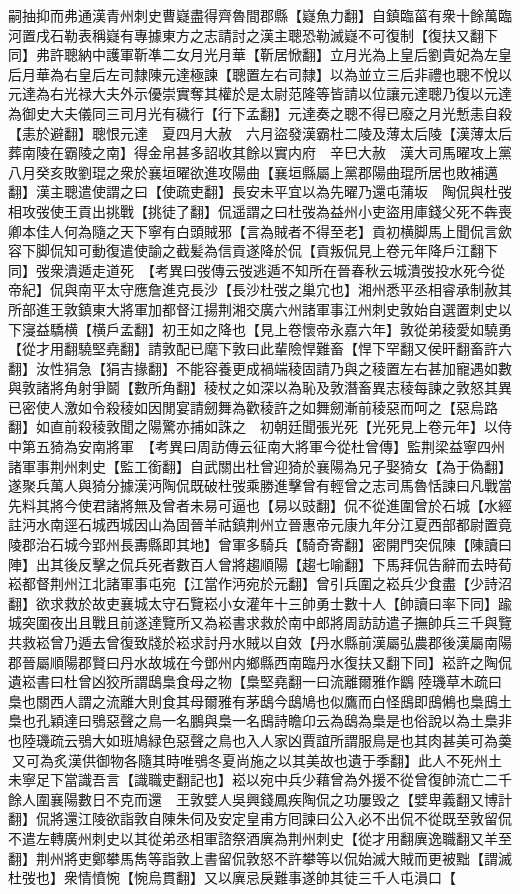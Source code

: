 嗣抽抑而弗通漢青州刺史曹嶷盡得齊魯間郡縣【嶷魚力翻】自鎮臨菑有衆十餘萬臨河置戌石勒表稱嶷有專據東方之志請討之漢主聰恐勒滅嶷不可復制【復扶又翻下同】弗許聰納中護軍靳凖二女月光月華【靳居惞翻】立月光為上皇后劉貴妃為左皇后月華為右皇后左司隸陳元達極諫【聰置左右司隸】以為並立三后非禮也聰不悅以元達為右光禄大夫外示優崇實奪其權於是太尉范隆等皆請以位讓元達聰乃復以元達為御史大夫儀同三司月光有穢行【行下孟翻】元達奏之聰不得已廢之月光慙恚自殺【恚於避翻】聰恨元達　夏四月大赦　六月盜發漢霸杜二陵及薄太后陵【漢薄太后葬南陵在霸陵之南】得金帛甚多詔收其餘以實内府　辛巳大赦　漢大司馬曜攻上黨八月癸亥敗劉琨之衆於襄垣曜欲進攻陽曲【襄垣縣屬上黨郡陽曲琨所居也敗補邁翻】漢主聰遣使謂之曰【使疏吏翻】長安未平宜以為先曜乃還屯蒲坂　陶侃與杜弢相攻弢使王貢出挑戰【挑徒了翻】侃遥謂之曰杜弢為益州小吏盜用庫錢父死不犇喪卿本佳人何為隨之天下寧有白頭賊邪【言為賊者不得至老】貢初横脚馬上聞侃言歛容下脚侃知可動復遣使諭之截髪為信貢遂降於侃【貢叛侃見上卷元年降戶江翻下同】弢衆潰遁走道死　【考異曰弢傳云弢逃遁不知所在晉春秋云城潰弢投水死今從帝紀】侃與南平太守應詹進克長沙【長沙杜弢之巢宂也】湘州悉平丞相睿承制赦其所部進王敦鎮東大將軍加都督江揚荆湘交廣六州諸軍事江州刺史敦始自選置刺史以下寖益驕横【横戶孟翻】初王如之降也【見上卷懷帝永嘉六年】敦從弟稜愛如驍勇【從才用翻驍堅堯翻】請敦配已麾下敦曰此輩險悍難畜【悍下罕翻又侯旰翻畜許六翻】汝性狷急【狷吉掾翻】不能容養更成禍端稜固請乃與之稜置左右甚加寵遇如數與敦諸將角射爭鬬【數所角翻】稜杖之如深以為恥及敦潛畜異志稜每諫之敦怒其異已密使人激如令殺稜如因閒宴請劒舞為歡稜許之如舞劒漸前稜惡而呵之【惡烏路翻】如直前殺稜敦聞之陽驚亦捕如誅之　初朝廷聞張光死【光死見上卷元年】以侍中第五猗為安南將軍　【考異曰周訪傳云征南大將軍今從杜曾傳】監荆梁益寧四州諸軍事荆州刺史【監工銜翻】自武關出杜曾迎猗於襄陽為兄子娶猗女【為于偽翻】遂聚兵萬人與猗分據漢沔陶侃既破杜弢乘勝進擊曾有輕曾之志司馬魯恬諫曰凡戰當先料其將今使君諸將無及曾者未易可逼也【易以豉翻】侃不從進圍曾於石城【水經註沔水南逕石城西城因山為固晉羊祜鎮荆州立晉惠帝元康九年分江夏西部都尉置竟陵郡治石城今郢州長夀縣即其地】曾軍多騎兵【騎奇寄翻】密開門突侃陳【陳讀曰陣】出其後反擊之侃兵死者數百人曾將趨順陽【趨七喻翻】下馬拜侃告辭而去時荀崧都督荆州江北諸軍事屯宛【江當作沔宛於元翻】曾引兵圍之崧兵少食盡【少詩沼翻】欲求救於故吏襄城太守石覽崧小女灌年十三帥勇士數十人【帥讀曰率下同】踰城突圍夜出且戰且前遂達覽所又為崧書求救於南中郎將周訪訪遣子撫帥兵三千與覽共救崧曾乃遁去曾復致牋於崧求討丹水賊以自效【丹水縣前漢屬弘農郡後漢屬南陽郡晉屬順陽郡賢曰丹水故城在今鄧州内鄉縣西南臨丹水復扶又翻下同】崧許之陶侃遺崧書曰杜曾凶狡所謂鴟梟食母之物【梟堅堯翻一曰流離爾雅作鶹陸璣草木疏曰梟也關西人謂之流離大則食其母爾雅有茅鴟今鴟鳩也似鷹而白怪䲭即䲭鵂也梟䲭土梟也孔穎達曰鴞惡聲之鳥一名鵬與梟一名䲭詩瞻卬云為鴟為梟是也俗說以為土梟非也陸璣疏云鴞大如班鳩緑色惡聲之鳥也入人家凶賈誼所謂服鳥是也其肉甚美可為羮又可為炙漢供御物各隨其時唯鴞冬夏尚施之以其美故也遺于季翻】此人不死州土未寧足下當識吾言【識職吏翻記也】崧以宛中兵少藉曾為外援不從曾復帥流亡二千餘人圍襄陽數日不克而還　王敦嬖人吳興錢鳳疾陶侃之功屢毁之【嬖卑義翻又博計翻】侃將還江陵欲詣敦自陳朱伺及安定皇甫方囘諫曰公入必不出侃不從既至敦留侃不遣左轉廣州刺史以其從弟丞相軍諮祭酒廙為荆州刺史【從才用翻廙逸職翻又羊至翻】荆州將吏鄭攀馬雋等詣敦上書留侃敦怒不許攀等以侃始滅大賊而更被黜【謂滅杜弢也】衆情憤惋【惋烏貫翻】又以廙忌戾難事遂帥其徒三千人屯溳口【